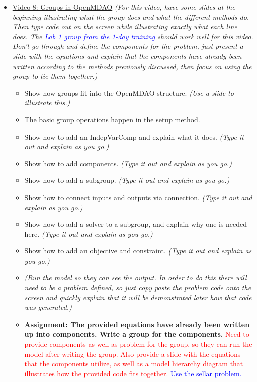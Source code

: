\documentclass[12pt, letterpaper]{article}
\begin{document}
\begin{itemize}
	\item \underline{Video 8: Groups in OpenMDAO} \textit{(For this video, have some slides at the beginning illustrating what the group does and what the different methods do. Then type code out on the screen while illustrating exactly what each line does. The \textcolor{blue}{Lab 1 group from the 1-day training} should work well for this video. Don’t go through and define the components for the problem, just present a slide with the equations and explain that the components have already been written according to the methods previously discussed, then focus on using the group to tie them together.)}
		\begin{itemize}
			\item Show how groups fit into the OpenMDAO structure. \textit{(Use a slide to illustrate this.)}
			\item The basic group operations happen in the setup method.
			\item Show how to add an IndepVarComp and explain what it does. \textit{(Type it out and explain as you go.)}
			\item Show how to add components. \textit{(Type it out and explain as you go.)}
			\item Show how to add a subgroup. \textit{(Type it out and explain as you go.)}
			\item Show how to connect inputs and outputs via connection. \textit{(Type it out and explain as you go.)}
			\item Show how to add a solver to a subgroup, and explain why one is needed here. \textit{(Type it out and explain as you go.)}
			\item Show how to add an objective and constraint. \textit{(Type it out and explain as you go.)}
			\item \textit{(Run the model so they can see the output. In order to do this there will need to be a problem defined, so just copy paste the problem code onto the screen and quickly explain that it will be demonstrated later how that code was generated.)}
			\item \textbf{Assignment: The provided equations have already been written up into components. Write a group for the components.} \textcolor{red}{Need to provide components as well as problem for the group, so they can run the model after writing the group. Also provide a slide with the equations that the components utilize, as well as a model hierarchy diagram that illustrates how the provided code fits together.} \textcolor{blue}{Use the sellar problem.}
		\end{itemize}
		

\end{itemize}
\end{document}
